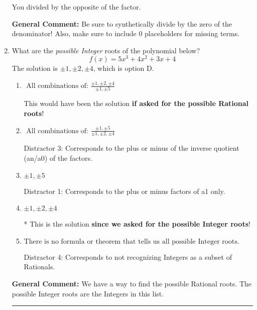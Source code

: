 \documentclass{extbook}[14pt]
\newcommand{\litem}[1]{\item #1

\rule{\textwidth}{0.4pt}}
\begin{document}
\begin{enumerate}
{\begin{enumerate}[label=\Alph*.]
 You divided by the opposite of the factor.
\end{enumerate}

\textbf{General Comment:} Be sure to synthetically divide by the zero of the denominator! Also, make sure to include 0 placeholders for missing terms.
}
\litem{
What are the \textit{possible Integer} roots of the polynomial below?
\[ f(x) = 5x^{3} +4 x^{2} +3 x + 4 \]The solution is \( \pm 1,\pm 2,\pm 4 \), which is option D.\begin{enumerate}[label=\Alph*.]
\item \( \text{ All combinations of: }\frac{\pm 1,\pm 2,\pm 4}{\pm 1,\pm 5} \)

This would have been the solution \textbf{if asked for the possible Rational roots}!
\item \( \text{ All combinations of: }\frac{\pm 1,\pm 5}{\pm 1,\pm 2,\pm 4} \)

 Distractor 3: Corresponds to the plus or minus of the inverse quotient (an/a0) of the factors. 
\item \( \pm 1,\pm 5 \)

 Distractor 1: Corresponds to the plus or minus factors of a1 only.
\item \( \pm 1,\pm 2,\pm 4 \)

* This is the solution \textbf{since we asked for the possible Integer roots}!
\item \( \text{There is no formula or theorem that tells us all possible Integer roots.} \)

 Distractor 4: Corresponds to not recognizing Integers as a subset of Rationals.
\end{enumerate}

\textbf{General Comment:} We have a way to find the possible Rational roots. The possible Integer roots are the Integers in this list.
}
\end{enumerate}
\end{document}
